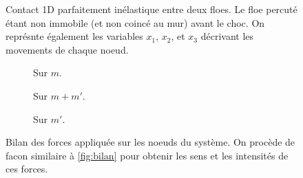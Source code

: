 \begin{figure}[!h]
    \centering
    \caption{Contact 1D parfaitement inélastique entre deux floes. Le floe percuté étant non immobile (et non coincé au mur) avant le choc. On représnte également les variables $x_1$, $x_2$, et $x_3$ décrivant les movements de chaque noeud.}
    \label{fig:contact1d2}
\end{figure}

\begin{figure}[!h]
    \begin{subfigure}[b]{0.25\textwidth}
        \centering
        \caption{Sur $m$.}
        \label{fig:bilan12}
    \end{subfigure}
    \begin{subfigure}[b]{0.31\textwidth}
        \centering
        \caption{Sur $m+m'$.}
        \label{fig:bilan22}
    \end{subfigure}
    \begin{subfigure}[b]{0.23\textwidth}
        \centering
        \caption{Sur $m'$.}
        \label{fig:bilan32}
    \end{subfigure}
       \caption{Bilan des forces appliquée sur les noeuds du système. On procède de facon similaire à \cref{fig:bilan} pour obtenir les sens et les intensités de ces forces.}
       \label{fig:bilan2}
\end{figure}

